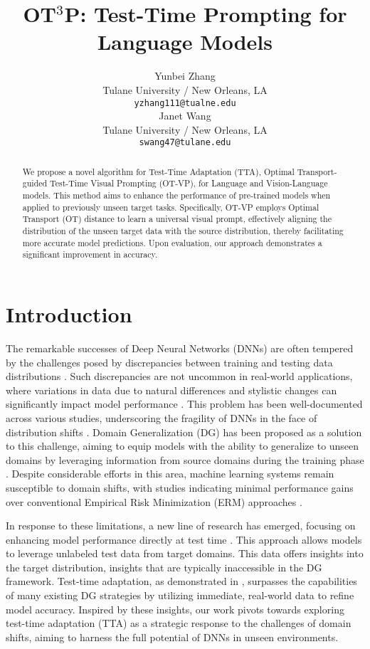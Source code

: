 \documentclass[11pt,a4paper]{article}
\title{OT$^3$P: Test-Time Prompting for Language Models}
\author{Yunbei Zhang \\
  Tulane University / New Orleans, LA \\
  \texttt{yzhang111@tualne.edu} \\\And
  Janet Wang \\
  Tulane University / New Orleans, LA \\
  \texttt{swang47@tulane.edu} \\}
\date{}
\begin{document}
\maketitle
\begin{abstract}
  We propose a novel algorithm for Test-Time Adaptation (TTA), Optimal Transport-guided Test-Time Visual Prompting (OT-VP), for Language and Vision-Language models.
  This method aims to enhance the performance of pre-trained models when applied to previously unseen target tasks. 
  Specifically, OT-VP employs Optimal Transport (OT) distance to learn a universal visual prompt, effectively aligning the distribution of the unseen target data with the source distribution, thereby facilitating more accurate model predictions. 
  Upon evaluation, our approach demonstrates a significant improvement in accuracy. 

\end{abstract}


\section{Introduction}

The remarkable successes of Deep Neural Networks (DNNs) are often tempered by the challenges posed by discrepancies between training and testing data distributions \cite{recht2019imagenet, hendrycks2019benchmarking, koh2021wilds}.
Such discrepancies are not uncommon in real-world applications, where variations in data due to natural differences and stylistic changes can significantly impact model performance \cite{ li2017deeper}.
This problem has been well-documented across various studies, underscoring the fragility of DNNs in the face of distribution shifts \cite{hendrycks2019benchmarking}. 
Domain Generalization (DG) has been proposed as a solution to this challenge, aiming to equip models with the ability to generalize to unseen domains by leveraging information from source domains during the training phase \cite{blanchard2011generalizing, zhou2022domain}. 
Despite considerable efforts in this area, machine learning systems remain susceptible to domain shifts, with studies indicating minimal performance gains over conventional Empirical Risk Minimization (ERM) approaches \cite{gulrajani2020search, mehra2022do}.

In response to these limitations, a new line of research has emerged, focusing on enhancing model performance directly at test time \cite{wang2021tent, NEURIPS2021_1415fe9f}. 
This approach allows models to leverage unlabeled test data from target domains. 
This data offers insights into the target distribution, insights that are typically inaccessible in the DG framework. 
Test-time adaptation, as demonstrated in \cite{NEURIPS2021_1415fe9f}, surpasses the capabilities of many existing DG strategies by utilizing immediate, real-world data to refine model accuracy.
Inspired by these insights, our work pivots towards exploring test-time adaptation (TTA) as a strategic response to the challenges of domain shifts, aiming to harness the full potential of DNNs in unseen environments.
\end{document}
